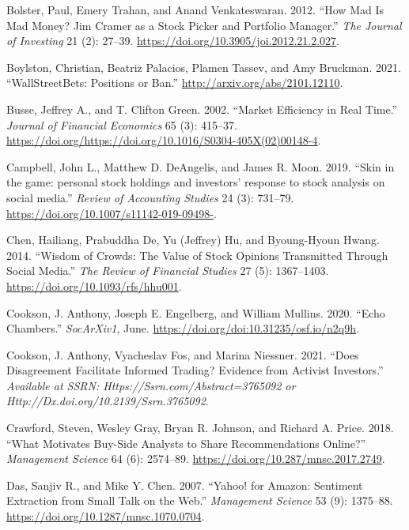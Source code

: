\documentclass[12pt,]{article}
\begin{document}
\leavevmode\hypertarget{ref-bolster2012}{}%
Bolster, Paul, Emery Trahan, and Anand Venkateswaran. 2012. ``How Mad Is
Mad Money? Jim Cramer as a Stock Picker and Portfolio Manager.''
\emph{The Journal of Investing} 21 (2): 27--39.
\url{https://doi.org/10.3905/joi.2012.21.2.027}.

\leavevmode\hypertarget{ref-boylston2021}{}%
Boylston, Christian, Beatriz Palacios, Plamen Tassev, and Amy Bruckman.
2021. ``WallStreetBets: Positions or Ban.''
\url{http://arxiv.org/abs/2101.12110}.

\leavevmode\hypertarget{ref-busse2002}{}%
Busse, Jeffrey A., and T. Clifton Green. 2002. ``Market Efficiency in
Real Time.'' \emph{Journal of Financial Economics} 65 (3): 415--37.
\url{https://doi.org/https://doi.org/10.1016/S0304-405X(02)00148-4}.

\leavevmode\hypertarget{ref-campbell2019}{}%
Campbell, John L., Matthew D. DeAngelis, and James R. Moon. 2019. ``Skin
in the game: personal stock holdings and investors' response to stock
analysis on social media.'' \emph{Review of Accounting Studies} 24 (3):
731--79. \url{https://doi.org/10.1007/s11142-019-09498-}.

\leavevmode\hypertarget{ref-chen2014}{}%
Chen, Hailiang, Prabuddha De, Yu (Jeffrey) Hu, and Byoung-Hyoun Hwang.
2014. ``Wisdom of Crowds: The Value of Stock Opinions Transmitted
Through Social Media.'' \emph{The Review of Financial Studies} 27 (5):
1367--1403. \url{https://doi.org/10.1093/rfs/hhu001}.

\leavevmode\hypertarget{ref-cookson2020}{}%
Cookson, J. Anthony, Joseph E. Engelberg, and William Mullins. 2020.
``Echo Chambers.'' \emph{SocArXiv1}, June.
\url{https://doi.org/doi:10.31235/osf.io/n2q9h}.

\leavevmode\hypertarget{ref-cookson2021}{}%
Cookson, J. Anthony, Vyacheslav Fos, and Marina Niessner. 2021. ``Does
Disagreement Facilitate Informed Trading? Evidence from Activist
Investors.'' \emph{Available at SSRN: Https://Ssrn.com/Abstract=3765092
or Http://Dx.doi.org/10.2139/Ssrn.3765092}.

\leavevmode\hypertarget{ref-crawford2018}{}%
Crawford, Steven, Wesley Gray, Bryan R. Johnson, and Richard A. Price.
2018. ``What Motivates Buy-Side Analysts to Share Recommendations
Online?'' \emph{Management Science} 64 (6): 2574--89.
\url{https://doi.org/10.287/mnsc.2017.2749}.

\leavevmode\hypertarget{ref-das2007}{}%
Das, Sanjiv R., and Mike Y. Chen. 2007. ``Yahoo! for Amazon: Sentiment
Extraction from Small Talk on the Web.'' \emph{Management Science} 53
(9): 1375--88. \url{https://doi.org/10.1287/mnsc.1070.0704}.
\end{document}
